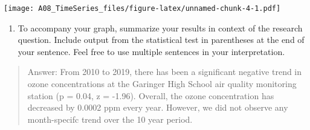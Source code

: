 \documentclass[
]{article}
\providecommand{\tightlist}{%
  \setlength{\itemsep}{0pt}\setlength{\parskip}{0pt}}
\begin{document}
\texttt{[image: A08\_TimeSeries\_files/figure-latex/unnamed-chunk-4-1.pdf]}

\begin{enumerate}
\def\labelenumi{\arabic{enumi}.}
\setcounter{enumi}{13}
\tightlist
\item
  To accompany your graph, summarize your results in context of the
  research question. Include output from the statistical test in
  parentheses at the end of your sentence. Feel free to use multiple
  sentences in your interpretation.
\end{enumerate}

\begin{quote}
Answer: From 2010 to 2019, there has been a significant negative trend
in ozone concentrations at the Garinger High School air quality
monitoring station (p = 0.04, z = -1.96). Overall, the ozone
concentration has decreased by 0.0002 ppm every year. However, we did
not observe any month-specifc trend over the 10 year period.
\end{quote}
\end{document}
